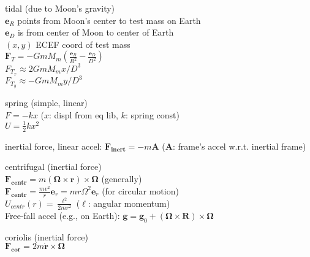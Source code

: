 \documentclass[letterpaper,landscape,10pt]{article}
\newenvironment{mydescription}
{\begin{description}
	\setlength{\itemsep}{0pt}
	\setlength{\parskip}{0pt}
	\setlength{\parsep}{-1pt}}
{\end{description}}
\begin{document}
{\begin{multicols}{3}
\begin{mydescription}

		\item[tidal] (due to Moon's gravity) \\
				$\mathbf{e}_R$ points from Moon's center to test mass on Earth \\
				$\mathbf{e}_D$ is from center of Moon to center of Earth \\
				$(x,y)$ ECEF coord of test mass\\
				$\mathbf{F}_T=-GmM_m \left( \frac{\mathbf{e}_R}{R^2} -
				\frac{\mathbf{e}_D}{D^2}\right)$\\
				$F_{T_x} \approx 2GmM_mx/D^3$\\
				$F_{T_y} \approx -GmM_my/D^3$

		\item[spring] (simple, linear) \\
			$F = -kx$ ($x$: displ from eq lib, $k$: spring const)  \\
			$U = \frac{1}{2}kx^2$\\

		\item[inertial force, linear accel:] $\mathbf{F_{inert}}=-m\mathbf{A}$
			($\mathbf{A}$: frame's accel w.r.t. inertial frame)

		\item[centrifugal] (inertial force) \\
		  $\mathbf{F_{centr}}=m\left( \mathbf{\Omega}\times\mathbf{r}
		  \right)\times\mathbf{\Omega}$ (generally)\\
		  $\mathbf{F_{centr}} = \frac{mv^2}{r}\mathbf{e}_r =
		   mr\Omega^2\mathbf{e}_r$ (for circular motion)\\
		  $U_{centr}(r) = \frac{\ell^2}{2mr^2}$ ($\ell$: angular momentum)\\
		  Free-fall accel (e.g., on Earth): $\mathbf{g}=\mathbf{g}_0+\left(
		  \mathbf{\Omega\times\mathbf{R}} \right)\times\mathbf{\Omega}$

		\item[coriolis] (inertial force)\\
		  $\mathbf{F_{cor}}=2m\dot{\mathbf{r}}\times \mathbf{\Omega}$



\end{mydescription}
\end{multicols}}
\end{document}
